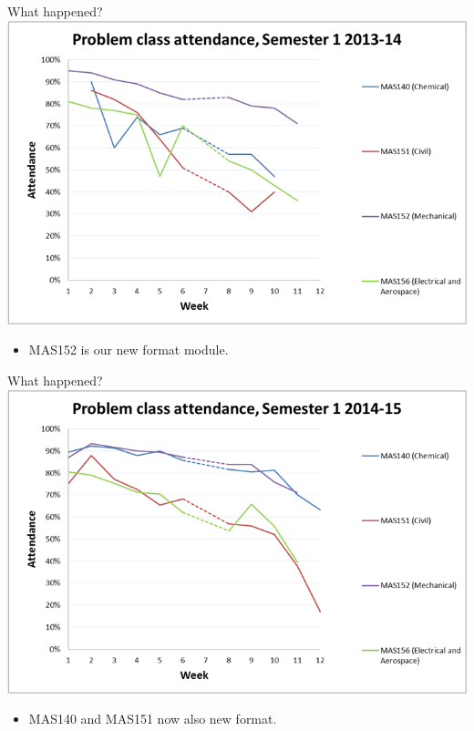 \documentclass[12pt,envcountsect]{beamer}
\theoremstyle{plain}
\theoremstyle{definition}
\begin{document}
\begin{frame}{What happened?}
\includegraphics[width=1\textwidth]{attendance_sem1_with_MAS152.png}
\begin{itemize}
\item MAS152 is our new format module.
\end{itemize}
\end{frame}

\begin{frame}{What happened?}
\includegraphics[width=1\textwidth]{attendance_sem1_2014_15.png}
\begin{itemize}
\item MAS140 and MAS151 now also new format.
\end{itemize}
\end{frame}

%
%
%
\end{document}
